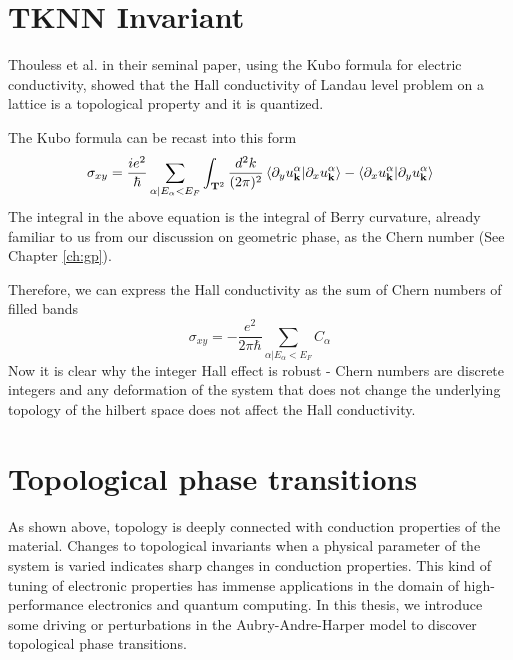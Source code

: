 \section{TKNN Invariant}
Thouless et al. in their seminal paper, using the Kubo formula for electric conductivity, showed that the Hall conductivity of Landau level problem on a lattice is a topological property
and it is quantized.

The Kubo formula can be recast into this form \cite{tong2016lectures, kohmoto1985topological}
\begin{equation}
 \sigma_{xy} = \frac{ie^2}{\hbar} \sum_{\alpha | E_{\alpha}<E_{F}}\int_{\mathbf{T}^2}\frac{d^2 k}{(2\pi)^2} \braket{\partial_{y}u_{\mathbf{k}}^\alpha | \partial_{x} u_{\mathbf{k}}^\alpha} - \braket{\partial_{x}u_{\mathbf{k}}^\alpha | \partial_{y} u_{\mathbf{k}}^\alpha}
\end{equation}
The integral in the above equation is the integral of Berry curvature, already familiar to us from our discussion on geometric phase, as the Chern number (See Chapter \ref{ch:gp}).

Therefore, we can express the Hall conductivity as the sum of Chern numbers of filled bands
\begin{equation}
 \sigma_{xy} = -\frac{e^2}{2\pi\hbar}\sum_{\alpha | E_{\alpha} < E_{F}} C_{\alpha}
\end{equation}
Now it is clear why the integer Hall effect is robust - Chern numbers are discrete integers and any deformation of the system that does not change the underlying topology of the hilbert space
does not affect the Hall conductivity.

\section{Topological phase transitions}
As shown above, topology is deeply connected with conduction properties of the material. Changes to topological invariants when a physical parameter of the system is varied indicates
sharp changes in conduction properties. This kind of tuning of electronic properties has immense applications in the domain of high-performance electronics and quantum computing.
In this thesis, we introduce some driving or perturbations in the Aubry-Andre-Harper model to discover topological phase transitions.